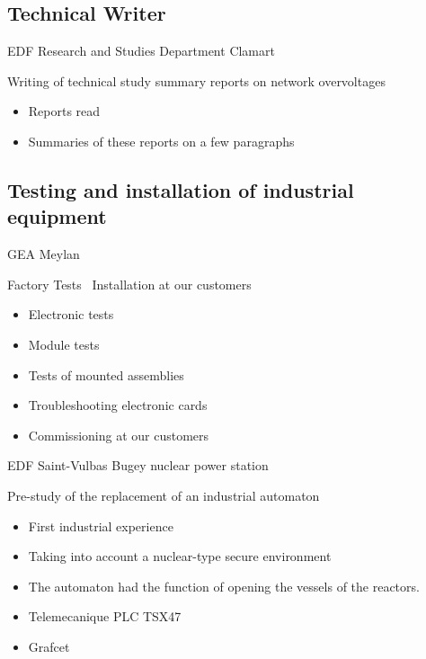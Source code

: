 \documentclass[11pt,a4paper,sans]{moderncv}   %
\begin{document}
\subsection{Technical Writer}
 {EDF Research and Studies Department} {Clamart} {} {Writing of technical study summary reports on network overvoltages 
\begin{itemize}
    \item Reports read
    \item Summaries of these reports on a few paragraphs
\end{itemize}
}

\subsection{Testing and installation of industrial equipment}
 {GEA} {Meylan} {} {Factory Tests \ Installation at our customers
\begin{itemize}
    \item Electronic tests
    \item Module tests
    \item Tests of mounted assemblies
    \item Troubleshooting electronic cards
    \item Commissioning at our customers
\end{itemize}
}
 {EDF} {Saint-Vulbas} {Bugey nuclear power station} {Pre-study of the replacement of an industrial automaton
\begin{itemize}
    \item First industrial experience
    \item Taking into account a nuclear-type secure environment
    \item The automaton had the function of opening the vessels of the reactors.
    \item Telemecanique PLC TSX47
    \item Grafcet
\end{itemize}
}
\end{document}
